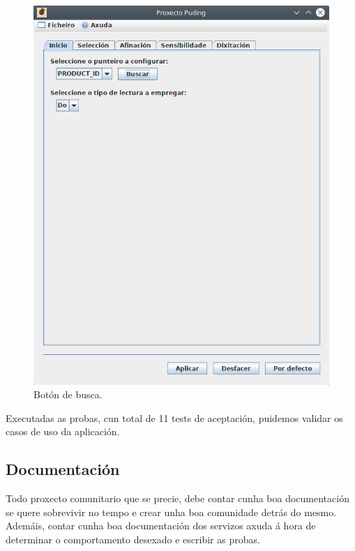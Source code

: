  \begin{figure}[htbp]
  \centering
  \includegraphics[scale=0.6,keepaspectratio=true]{./imagenes/boton-busca.png}
  \caption{Botón de busca.}
  \label{figura:BotonBusca}
 \end{figure}
 
 Executadas as probas, cun total de 11 tests de aceptación, puidemos validar os
 casos de uso da aplicación.
 
 \subsection{Documentación}
 
 Todo proxecto comunitario que se precie, debe contar cunha boa documentación se
 quere sobrevivir no tempo e crear unha boa comunidade detrás do mesmo. \\
 
 Ademáis, contar cunha boa documentación dos servizos axuda á hora de determinar
 o comportamento desexado e escribir as probas. \\
 
